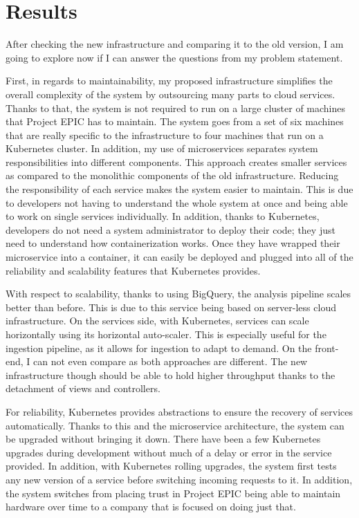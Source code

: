 \chapter{Results}

After checking the new infrastructure and comparing it to the old version, I am going to explore now if I can answer the questions from my problem statement. 

First, in regards to maintainability, my proposed infrastructure simplifies the overall complexity of the system by outsourcing many parts to cloud services. Thanks to that, the system is not required to run on a large cluster of machines that Project EPIC has to maintain. The system goes from a set of six machines that are really specific to the infrastructure to four machines that run on a Kubernetes cluster.  In addition, my use of microservices separates system responsibilities into different components. This approach creates smaller services as compared to the monolithic components of the old infrastructure. Reducing the responsibility of each service makes the system easier to maintain. This is due to developers not having to understand the whole system at once and being able to work on single services individually. In addition, thanks to Kubernetes, developers do not need a system administrator to deploy their code; they just need to understand how containerization works. Once they have wrapped their microservice into a container, it can easily be deployed and plugged into all of the reliability and scalability features that Kubernetes provides. 

With respect to scalability, thanks to using BigQuery, the analysis pipeline scales better than before. This is due to this service being based on server-less cloud infrastructure. On the services side, with Kubernetes, services can scale horizontally using its horizontal auto-scaler. This is especially useful for the ingestion pipeline, as it allows for ingestion to adapt to demand. On the front-end, I can not even compare as both approaches are different. The new infrastructure though should be able to hold higher throughput thanks to the detachment of views and controllers. 

For reliability, Kubernetes provides abstractions to ensure the recovery of services automatically. Thanks to this and the microservice architecture, the system can be upgraded without bringing it down. There have been a few Kubernetes upgrades during development without much of a delay or error in the service provided. In addition, with Kubernetes rolling upgrades, the system first tests any new version of a service before switching incoming requests to it. In addition, the system switches from placing trust in Project EPIC being able to maintain hardware over time to a company that is focused on doing just that. 

